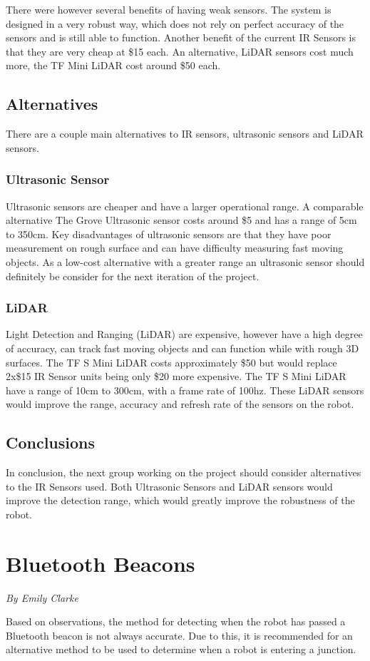 \documentclass[12pt]{report}
\newcommand{\sectionAuthor}[1]{{\small\vspace{-1em}\textit{#1}}\bigskip\par}
\begin{document}
There were however several benefits of having weak sensors. The system is designed in a very robust way, which does not rely on perfect accuracy of the sensors and is still able to function. Another benefit of the current IR Sensors is that they are very cheap at \$15 each. An alternative, LiDAR sensors cost much more, the TF Mini LiDAR cost around \$50 each.

\subsection{Alternatives}
There are a couple main alternatives to IR sensors, ultrasonic sensors and LiDAR sensors.

\subsubsection{Ultrasonic Sensor}
Ultrasonic sensors are cheaper and have a larger operational range. A comparable alternative The Grove Ultrasonic sensor costs around \$5 and has a range of 5cm to 350cm. Key disadvantages of ultrasonic sensors are that they have poor measurement on rough surface and can have difficulty measuring fast moving objects. As a low-cost alternative with a greater range an ultrasonic sensor should definitely be consider for the next iteration of the project.

\subsubsection{LiDAR}
 Light Detection and Ranging (LiDAR) are expensive, however have a high degree of accuracy, can track fast moving objects and can function while with rough 3D surfaces. The TF S Mini LiDAR costs approximately \$50 but would replace 2x\$15 IR Sensor units being only \$20 more expensive. The TF S Mini LiDAR have a range of 10cm to 300cm, with a frame rate of 100hz. These LiDAR sensors would improve the range, accuracy and refresh rate of the sensors on the robot.
 
\subsection{Conclusions}
In conclusion, the next group working on the project should consider alternatives to the IR Sensors used. Both Ultrasonic Sensors and LiDAR sensors would improve the detection range, which would greatly improve the robustness of the robot.

\section{Bluetooth Beacons}
\sectionAuthor{By Emily Clarke}
Based on observations, the method for detecting when the robot has passed a Bluetooth beacon is not always accurate. Due to this, it is recommended for an alternative method to be used to determine when a robot is entering a junction. 
\end{document}

